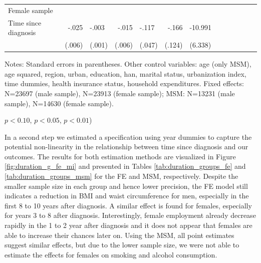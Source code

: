 \begin{table}[h]
\begin{adjustbox}{max width=\linewidth}
\begin{threeparttable}
{\begin{tabular}{l*{6}{D{.}{.}{-1}l}}
Female sample &&&&&&\\
Time since diagnosis  & -.025\sym{***}&    -.003\sym{*}  &    -.015\sym{***}&    -.117\sym{**} &    -.166         &  -10.991\sym{*}  \\
                &   (.006)         &   (.001)         &   (.006)         &   (.047)         &   (.124)         &  (6.338)         \\                 
\bottomrule
\end{tabular}
\begin{tablenotes}
\item Notes: Standard errors in parentheses. Other control variables: age (only MSM), age squared, region, urban, education, han, marital status, urbanization index, time dummies, health insurance status, household expenditures. Fixed effects: N=23697 (male sample), N=23913 (female sample); MSM:  N=13231 (male sample), N=14630 (female sample).
\item \sym{*} \(p<0.10\), \sym{**} \(p<0.05\), \sym{***} \(p<0.01\))
\end{tablenotes}
}
\end{threeparttable}
\end{adjustbox}
\end{table}

\FloatBarrier

In a second step we estimated a specification using year dummies to capture the potential non-linearity in the relationship between time since diagnosis and our outcomes. The results for both estimation methods are visualized in Figure \ref{fig:duration_g_fe_mi} and presented in Tables \ref{tab:duration_groups_fe} and \ref{tab:duration_groups_msm} for the \ac{FE} and \ac{MSM}, respectively. Despite the smaller sample size in each group and hence lower precision, the \ac{FE} model still indicates a reduction in \ac{BMI} and waist circumference for men, especially in the first 8 to 10 years after diagnosis. A similar effect is found for females, especially for years 3 to 8 after diagnosis. Interestingly, female employment already decrease rapidly in the 1 to 2 year after diagnosis and it does not appear that females are able to increase their chances later on. Using the \ac{MSM}, all point estimates suggest similar effects, but due to the lower sample size, we were not able to estimate the effects for females on smoking and alcohol consumption.


